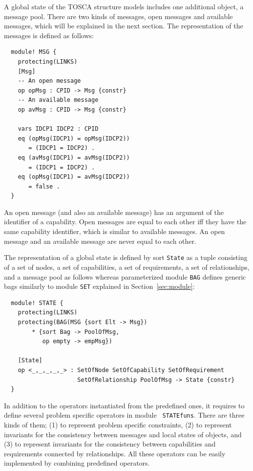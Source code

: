 \documentclass[12pt]{report}
\begin{document}
A global state of the TOSCA structure models includes one additional
object, a message pool. There are two kinds of messages, open messages
and available messages, which will be explained in the next
section. The representation of the messages is defined as follows:
\small
\begin{verbatim}
  module! MSG {
    protecting(LINKS)
    [Msg]
    -- An open message
    op opMsg : CPID -> Msg {constr}
    -- An available message
    op avMsg : CPID -> Msg {constr}
  
    vars IDCP1 IDCP2 : CPID 
    eq (opMsg(IDCP1) = opMsg(IDCP2))
       = (IDCP1 = IDCP2) .
    eq (avMsg(IDCP1) = avMsg(IDCP2))
       = (IDCP1 = IDCP2) .
    eq (opMsg(IDCP1) = avMsg(IDCP2))
       = false .
  }    
\end{verbatim}
\normalsize
An open message (and also an available message) has an argument of the
identifier of a capability. Open messages are equal to each other iff
they have the same capability identifier, which is similar to
available messages. An open message and an available message are never
equal to each other.

The representation of a global state is defined by sort {\tt State} as
a tuple consisting of a set of nodes, a set of capabilities, a set of
requirements, a set of relationships, and a message pool as follows
whereas parameterized module {\tt BAG} defines generic bags similarly
to module {\tt SET} explained in Section~\ref{sec:module}:
\small
\begin{verbatim}
  module! STATE {
    protecting(LINKS)
    protecting(BAG(MSG {sort Elt -> Msg})
        * {sort Bag -> PoolOfMsg,
           op empty -> empMsg})
  
    [State]
    op <_,_,_,_,_> : SetOfNode SetOfCapability SetOfRequirement 
                     SetOfRelationship PoolOfMsg -> State {constr}
  }
\end{verbatim}
\normalsize

In addition to the operators instantiated from the predefined ones, it
requires to define several problem specific operators in module {\tt
  STATEfuns}. There are three kinds of them; (1) to represent problem
specific constraints, (2) to represent invariants for the consistency
between messages and local states of objects, and (3) to represent
invariants for the consistency between capabilities and requirements
connected by relationships. All these operators can be easily
implemented by combining predefined operators.
\end{document}
